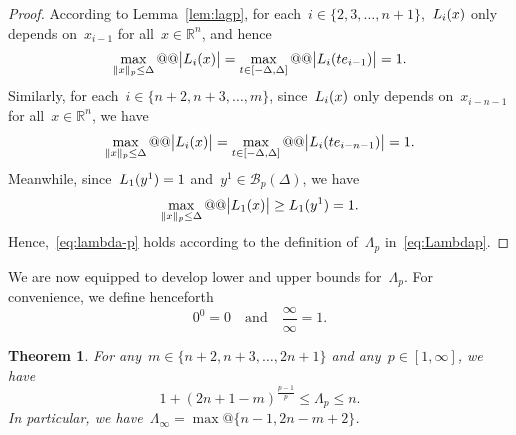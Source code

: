 \documentclass{article}
\numberwithin{equation}{section}
\theoremstyle{definition}
\theoremstyle{plain}
\newtheorem{theorem}{Theorem}[section]
\theoremstyle{remark}
\newcommand*{\abs}[2][]{#1\lvert#2#1\rvert}
\newcommand*{\norm}[2][]{#1\lVert#2#1\rVert}
\newcommand*{\set}[2][]{#1\{#2#1\}}
\newcommand*{\R}{\mathbb{R}}
\newcommand*{\lagp}[1][]{L\ifblank{#1}{}{_{#1}}}
\newcommand{\reviewed}[1]{\texorpdfstring{{\color{NavyBlue}#1}}{#1}}
\begin{document}
\begin{proof}
    According to Lemma~\ref{lem:lagp}, for each~$i \in \set{2, 3, \dots, n + 1}$,~$\lagp[i](x)$ only depends on~$x_{i - 1}$ for all~$x \in \R^n$, and hence
    \begin{equation*}
        \max_{\norm{x}_p \le \Delta} @@ \abs[\big]{\lagp[i](x)} = \max_{t \in [-\Delta, \Delta]} @@ \abs[\big]{\lagp[i](t e_{i - 1})} = 1.
    \end{equation*}
    Similarly, for each~$i \in \set{n + 2, n + 3, \dots, m}$, since~$\lagp[i](x)$ only depends on~$x_{i - n - 1}$ for all~$x \in \R^n$, we have
    \begin{equation*}
        \max_{\norm{x}_p \le \Delta} @@ \abs[\big]{\lagp[i](x)} = \max_{t \in [-\Delta, \Delta]} @@ \abs[\big]{\lagp[i](t e_{i - n - 1})} = 1.
    \end{equation*}
    Meanwhile, since~$\lagp[1](y^1) = 1$ and~$y^1 \in \mathcal{B}_p(\Delta)$, we have
    \begin{equation*}
        \max_{\norm{x}_p \le \Delta} @@ \abs[\big]{\lagp[1](x)} \ge \lagp[1](y^1) = 1.
    \end{equation*}
    Hence,~\eqref{eq:lambda-p} holds according to the definition of~$\Lambda_p$ in~\eqref{eq:Lambdap}.
\end{proof}

We are now equipped to develop lower and upper bounds for~$\Lambda_p$.
For \reviewed{convenience}, we define henceforth
\begin{equation*}
    0^0 = 0 \quad \text{and} \quad \frac{\infty}{\infty} = 1.
\end{equation*}

\begin{theorem}
    \label{thm:bounds}
    For any~$m \in \set{n + 2, n + 3, \dots, 2n + 1}$ and any~$p \in [1, \infty]$, we have
    \begin{equation}
    \label{eq:bounds}
        1 + (2n + 1 - m)^{\frac{p - 1}{p}} \le \Lambda_p \le n.
    \end{equation}
    \reviewed{In particular, we have~$\Lambda_{\infty} = \max @ \set{n - 1, 2n - m + 2}$.}
\end{theorem}
\end{document}
